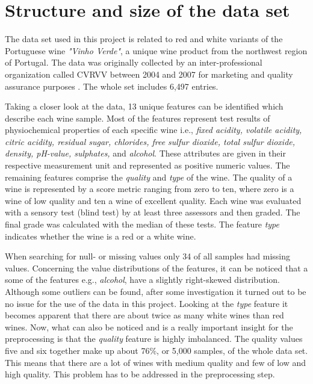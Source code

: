 \section{Structure and size of the data set}\label{sec:data_structure}


The data set used in this project is related to red and white variants of the Portuguese wine \textit{"Vinho Verde"}, a unique wine product from the northwest region of Portugal. The data was originally collected by an inter-professional organization called CVRVV between 2004 and 2007 for marketing and quality assurance purposes \citep{misc_wine_quality_186}. The whole set includes 6,497 entries.

Taking a closer look at the data, 13 unique features can be identified which describe each wine sample. Most of the features represent test results of physiochemical properties of each specific wine i.e., \textit{fixed acidity, volatile acidity, citric acidity, residual sugar, chlorides, free sulfur dioxide, total sulfur dioxide, density, pH-value, sulphates,}  and \textit{alcohol}. These attributes are given in their respective measurement unit and represented as positive numeric values. The remaining features comprise the \textit{quality} and \textit{type} of the wine. The quality of a wine is represented by a score metric ranging from zero to ten, where zero is a wine of low quality and ten a wine of excellent quality. Each wine was evaluated with a sensory test (blind test) by at least three assessors and then graded. The final grade was calculated with the median of these tests. The feature \textit{type} indicates whether the wine is a red or a white wine.

When searching for null- or missing values only 34 of all samples had missing values. Concerning the value distributions of the features, it can be noticed that a some of the features e.g., \textit{alcohol}, have a slightly right-skewed distribution. Although some outliers can be found, after some investigation it turned out to be no issue for the use of the data in this project. Looking at the \textit{type} feature it becomes apparent that there are about twice as many white wines than red wines. Now, what can also be noticed and is a really important insight for the preprocessing is that the \textit{quality} feature is highly imbalanced. The quality values five and six together make up about 76\%, or 5,000 samples, of the whole data set. This means that there are a lot of wines with medium quality and few of low and high quality. This problem has to be addressed in the preprocessing step.
\pagebreak